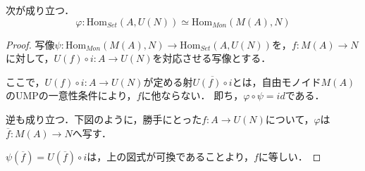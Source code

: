 \documentclass[uplatex, 12pt, dvipdfmx]{jsarticle}
\begin{document}
\begin{proposition*}
    次が成り立つ．
    \[ \varphi:\mathrm{Hom}_{Set}(A,U(N))\simeq\mathrm{Hom}_{Mon}(M(A),N) \]
\end{proposition*}
\begin{proof}
    写像$\psi:\mathrm{Hom}_{Mon}(M(A),N)\to\mathrm{Hom}_{Set}(A,U(N))$を，$f:M(A)\to N$に対して，$U(f)\circ i:A\to U(N)$を対応させる写像とする．
    \begin{center}
    \end{center}
    ここで，$U(f)\circ i:A\to U(N)$が定める射$\overline{U(f)\circ i}$とは，自由モノイド$M(A)$のUMPの一意性条件により，$f$に他ならない．
    即ち，$\varphi\circ\psi=id$である．
    
    逆も成り立つ．下図のように，勝手にとった$f:A\to U(N)$について，$\varphi$は$\overline{f}:M(A)\to N$へ写す．
    \begin{center}
    \end{center}
    $\psi(\overline{f})=U(\overline{f})\circ i$は，上の図式が可換であることより，$f$に等しい．
\end{proof}
\end{document}
